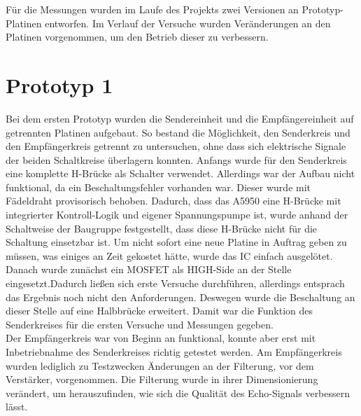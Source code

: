Für die Messungen wurden im Laufe des Projekts zwei Versionen an Prototyp-Platinen entworfen. Im Verlauf der Versuche wurden Veränderungen an den Platinen vorgenommen, um den Betrieb dieser zu verbessern. 
\section{Prototyp 1}
Bei dem ersten Prototyp wurden die Sendereinheit und die Empfängereinheit auf getrennten Platinen aufgebaut. So bestand die Möglichkeit, den Senderkreis und den Empfängerkreis getrennt zu untersuchen, ohne dass sich elektrische Signale der beiden Schaltkreise überlagern konnten. Anfangs wurde für den Senderkreis eine komplette H-Brücke als Schalter verwendet. Allerdings war der Aufbau nicht funktional, da ein Beschaltungsfehler vorhanden war. Dieser wurde mit Fädeldraht provisorisch behoben.  Dadurch, dass das A5950 eine H-Brücke mit integrierter Kontroll-Logik und eigener Spannungspumpe ist, wurde anhand der Schaltweise der Baugruppe festgestellt, dass diese H-Brücke nicht für die Schaltung einsetzbar ist. Um nicht sofort eine neue Platine in Auftrag geben zu müssen, was einiges an Zeit gekostet hätte, wurde das IC einfach ausgelötet. Danach wurde zunächst ein MOSFET als HIGH-Side an der Stelle eingesetzt.Dadurch ließen sich erste Versuche durchführen, allerdings entsprach das Ergebnis noch nicht den Anforderungen. Deswegen wurde die Beschaltung an dieser Stelle auf eine Halbbrücke erweitert. Damit war die Funktion des Senderkreises für die ersten Versuche und Messungen gegeben.\\
Der Empfängerkreis war von Beginn an funktional, konnte aber erst mit Inbetriebnahme des Senderkreises richtig getestet werden. Am Empfängerkreis wurden lediglich zu Testzwecken Änderungen an der Filterung, vor dem Verstärker, vorgenommen. Die Filterung wurde in ihrer Dimensionierung verändert, um herauszufinden, wie sich die Qualität des Echo-Signals verbessern lässt.\\

